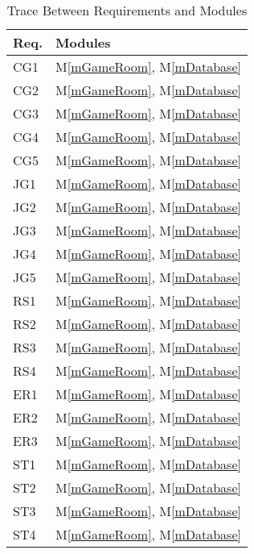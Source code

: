 \documentclass[12pt, titlepage]{article}
\newcommand{\mref}[1]{M\ref{#1}}
\begin{document}
\begin{table}[H]
\centering
\begin{tabular}{p{} p{}}
\toprule
\textbf{Req.} & \textbf{Modules}\\
\midrule
CG1 & \mref{mGameRoom}, \mref{mDatabase}\\
CG2 & \mref{mGameRoom}, \mref{mDatabase}\\
CG3 & \mref{mGameRoom}, \mref{mDatabase}\\
CG4 & \mref{mGameRoom}, \mref{mDatabase}\\
CG5 & \mref{mGameRoom}, \mref{mDatabase}\\
JG1 & \mref{mGameRoom}, \mref{mDatabase}\\
JG2 & \mref{mGameRoom}, \mref{mDatabase}\\
JG3 & \mref{mGameRoom}, \mref{mDatabase}\\
JG4 & \mref{mGameRoom}, \mref{mDatabase}\\
JG5 & \mref{mGameRoom}, \mref{mDatabase}\\
RS1 & \mref{mGameRoom}, \mref{mDatabase}\\
RS2 & \mref{mGameRoom}, \mref{mDatabase}\\
RS3 & \mref{mGameRoom}, \mref{mDatabase}\\
RS4 & \mref{mGameRoom}, \mref{mDatabase}\\
ER1 & \mref{mGameRoom}, \mref{mDatabase}\\
ER2 & \mref{mGameRoom}, \mref{mDatabase}\\
ER3 & \mref{mGameRoom}, \mref{mDatabase}\\
ST1 & \mref{mGameRoom}, \mref{mDatabase}\\
ST2 & \mref{mGameRoom}, \mref{mDatabase}\\
ST3 & \mref{mGameRoom}, \mref{mDatabase}\\
ST4 & \mref{mGameRoom}, \mref{mDatabase}\\
\bottomrule
\end{tabular}
\caption{Trace Between Requirements and Modules}
\label{TblRT}
\end{table}
\end{document}
